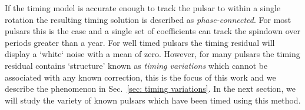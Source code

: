 If the timing model is accurate enough to track the pulsar to within a single
rotation the resulting timing solution is described as \emph{phase-connected}.
For most pulsars this is the case and a single set of coefficients can track
the spindown over periods greater than a year. For well timed pulsars the
timing residual will display a `white` noise with a mean of zero. However, for
many pulsars the timing residual contains `structure' known as \emph{timing
variations} which cannot be associated with any known correction, this is the
focus of this work and we describe the phenomenon in Sec.~\ref{sec: timing
variations}. In the next section, we will study the variety of known pulsars
which have been timed using this method.


